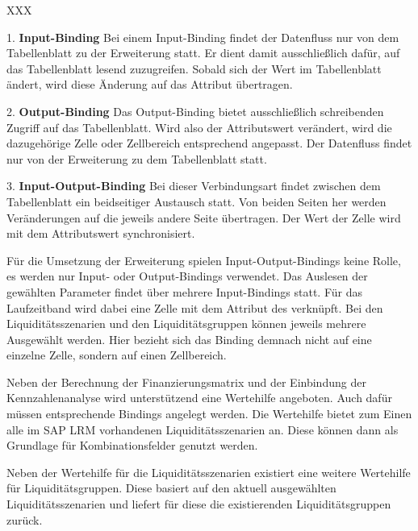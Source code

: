 \begin{onehalfspacing}
\begin{seToplist}{ XXX }

\item[1.] \textbf{Input-Binding} \newline
Bei einem Input-Binding findet der Datenfluss nur von dem Tabellenblatt zu der Erweiterung statt. Er dient damit ausschließlich dafür, auf das Tabellenblatt lesend zuzugreifen. Sobald sich der Wert im Tabellenblatt ändert, wird diese Änderung auf das Attribut übertragen.

\item[2.] \textbf{Output-Binding} \newline
Das Output-Binding bietet ausschließlich schreibenden Zugriff auf das Tabellenblatt. Wird also der Attributswert verändert, wird die dazugehörige Zelle oder Zellbereich entsprechend angepasst. Der Datenfluss findet nur von der Erweiterung zu dem Tabellenblatt statt.

\item[3.] \textbf{Input-Output-Binding} \newline
Bei dieser Verbindungsart findet zwischen dem Tabellenblatt ein beidseitiger Austausch statt. Von beiden Seiten her werden Veränderungen auf die jeweils andere Seite übertragen. Der Wert der Zelle wird mit dem Attributswert synchronisiert.

\end{seToplist}

Für die Umsetzung der Erweiterung spielen Input-Output-Bindings keine Rolle, es werden nur Input- oder Output-Bindings verwendet. Das Auslesen der gewählten Parameter findet über mehrere Input-Bindings statt. Für das Laufzeitband wird dabei eine Zelle mit dem Attribut  des  verknüpft. Bei den Liquiditätsszenarien und den Liquiditätsgruppen können jeweils mehrere Ausgewählt werden. Hier bezieht sich das Binding demnach nicht auf eine einzelne Zelle, sondern auf einen Zellbereich.

Neben der Berechnung der Finanzierungsmatrix und der Einbindung der Kennzahlenanalyse wird unterstützend eine Wertehilfe angeboten. Auch dafür müssen entsprechende Bindings angelegt werden. Die Wertehilfe bietet zum Einen alle im SAP LRM vorhandenen Liquiditätsszenarien an. Diese können dann als Grundlage für Kombinationsfelder genutzt werden.

Neben der Wertehilfe für die Liquiditätsszenarien existiert eine weitere Wertehilfe für Liquiditätsgruppen. Diese basiert auf den aktuell ausgewählten Liquiditätsszenarien und liefert für diese die existierenden Liquiditätsgruppen zurück.


\end{onehalfspacing}

